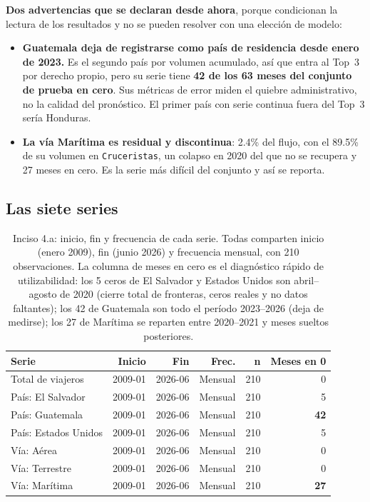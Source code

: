 \documentclass[12pt,letterpaper]{article}
\newcommand{\subseccion}[1]{\subsection{#1}}
\begin{document}
\textbf{Dos advertencias que se declaran desde ahora}, porque condicionan la lectura de los
resultados y no se pueden resolver con una elección de modelo:

\begin{itemize}[leftmargin=1.4em,itemsep=3pt]
  \item \textbf{Guatemala deja de registrarse como país de residencia desde enero de 2023.} Es
  el segundo país por volumen acumulado, así que entra al Top~3 por derecho propio, pero su
  serie tiene \textbf{42 de los 63 meses del conjunto de prueba en cero}. Sus métricas de error
  miden el quiebre administrativo, no la calidad del pronóstico. El primer país con serie
  continua fuera del Top~3 sería Honduras.
  \item \textbf{La vía Marítima es residual y discontinua}: 2.4\% del flujo, con el 89.5\% de su
  volumen en \texttt{Cruceristas}, un colapso en 2020 del que no se recupera y 27 meses en cero.
  Es la serie más difícil del conjunto y así se reporta.
\end{itemize}

\subseccion{Las siete series}

\begin{table}[H]
\centering
\small
\begin{tabular}{lrrrrr}
\toprule
\textbf{Serie} & \textbf{Inicio} & \textbf{Fin} & \textbf{Frec.} & \textbf{n} & \textbf{Meses en 0} \\
\midrule
Total de viajeros               & 2009-01 & 2026-06 & Mensual & 210 & 0 \\
País: El Salvador              & 2009-01 & 2026-06 & Mensual & 210 & 5 \\
País: Guatemala                & 2009-01 & 2026-06 & Mensual & 210 & \textbf{42} \\
País: Estados Unidos           & 2009-01 & 2026-06 & Mensual & 210 & 5 \\
Vía: Aérea                     & 2009-01 & 2026-06 & Mensual & 210 & 0 \\
Vía: Terrestre                 & 2009-01 & 2026-06 & Mensual & 210 & 0 \\
Vía: Marítima                  & 2009-01 & 2026-06 & Mensual & 210 & \textbf{27} \\
\bottomrule
\end{tabular}
\caption{Inciso 4.a: inicio, fin y frecuencia de cada serie. Todas comparten inicio (enero 2009),
fin (junio 2026) y frecuencia mensual, con 210 observaciones. La columna de meses en cero es el
diagnóstico rápido de utilizabilidad: los 5 ceros de El Salvador y Estados Unidos son
abril--agosto de 2020 (cierre total de fronteras, ceros reales y no datos faltantes); los 42 de
Guatemala son todo el período 2023--2026 (deja de medirse); los 27 de Marítima se reparten entre
2020--2021 y meses sueltos posteriores.}
\end{table}
\end{document}
